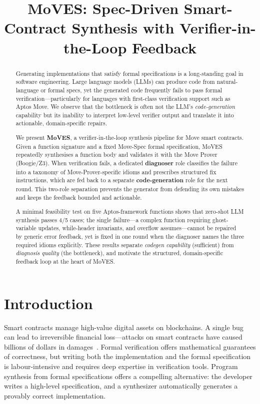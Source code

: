 \documentclass[conference]{IEEEtran}
\title{MoVES: Spec-Driven Smart-Contract Synthesis with Verifier-in-the-Loop Feedback}
\author{
\IEEEauthorblockN{Anonymous Author(s)}
\IEEEauthorblockA{
  Anonymous Institution\\
  Anonymous City, Country\\
  Email: anonymous@example.com}
}
\begin{document}
\maketitle

\begin{abstract}
Generating implementations that satisfy formal specifications is a long-standing goal in software engineering. Large language models (LLMs) can produce code from natural-language or formal specs, yet the generated code frequently fails to pass formal verification---particularly for languages with first-class verification support such as Aptos Move. We observe that the bottleneck is often not the LLM's \textit{code-generation} capability but its inability to interpret low-level verifier output and translate it into actionable, domain-specific repairs.

We present \textbf{MoVES}, a verifier-in-the-loop synthesis pipeline for Move smart contracts. Given a function signature and a fixed Move-Spec formal specification, MoVES repeatedly synthesises a function body and validates it with the Move Prover (Boogie/Z3). When verification fails, a dedicated \textbf{diagnoser} role classifies the failure into a taxonomy of Move-Prover-specific idioms and prescribes structured fix instructions, which are fed back to a separate \textbf{code-generation} role for the next round. This two-role separation prevents the generator from defending its own mistakes and keeps the feedback bounded and actionable.

A minimal feasibility test on five Aptos-framework functions shows that zero-shot LLM synthesis passes 4/5 cases; the single failure---a complex function requiring ghost-variable updates, while-header invariants, and overflow assumes---cannot be repaired by generic error feedback, yet is fixed in one round when the diagnoser names the three required idioms explicitly. These results separate \textit{codegen capability} (sufficient) from \textit{diagnosis quality} (the bottleneck), and motivate the structured, domain-specific feedback loop at the heart of MoVES.
\end{abstract}

\IEEEpeerreviewmaketitle

\section{Introduction}\label{sec:intro}

Smart contracts manage high-value digital assets on blockchains. A single bug can lead to irreversible financial loss---attacks on smart contracts have caused billions of dollars in damages~\cite{chen2021evaluating,austin2021program}. Formal verification offers mathematical guarantees of correctness, but writing both the implementation and the formal specification is labour-intensive and requires deep expertise in verification tools. Program synthesis from formal specifications offers a compelling alternative: the developer writes a high-level specification, and a synthesizer automatically generates a provably correct implementation.
\end{document}
